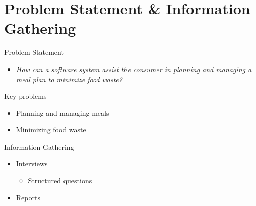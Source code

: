 \section{Problem Statement \& Information Gathering} 
\begin{frame}{Problem Statement}
    \begin{itemize}
        \item \textit{How can a software system assist the consumer in planning and managing a meal plan to minimize food waste?}
    \end{itemize}
    	Key problems
        \begin{itemize}
            \item Planning and managing meals
            \item Minimizing food waste
        \end{itemize}
\end{frame}

\begin{frame}{Information Gathering}
    \begin{itemize}
        \item Interviews
        \begin{itemize}
        	\item Structured questions
        \end{itemize}
        \item Reports
    \end{itemize}
\end{frame}

